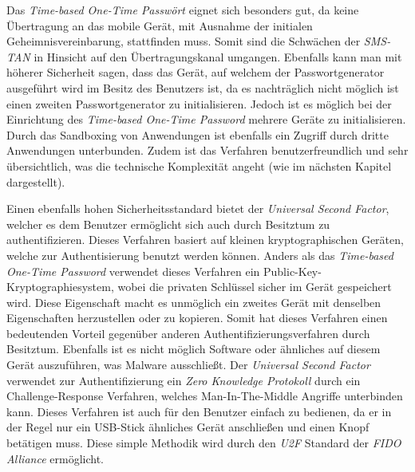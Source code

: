 \documentclass[11pt,a4paper,ngerman]{scrreprt}
\begin{document}
Das \textit{Time-based One-Time Passwört} eignet sich besonders gut, da keine Übertragung an das mobile Gerät, mit Ausnahme der initialen Geheimnisvereinbarung, stattfinden muss. Somit sind die Schwächen der \textit{SMS-TAN} in Hinsicht auf den Übertragungskanal umgangen. Ebenfalls kann man mit höherer Sicherheit sagen, dass das Gerät, auf welchem der Passwortgenerator ausgeführt wird im Besitz des Benutzers ist, da es nachträglich nicht möglich ist einen zweiten Passwortgenerator zu initialisieren. Jedoch ist es möglich bei der Einrichtung des \textit{Time-based One-Time Password} mehrere Geräte zu initialisieren. Durch das Sandboxing von Anwendungen ist ebenfalls ein Zugriff durch dritte Anwendungen unterbunden. Zudem ist das Verfahren benutzerfreundlich und sehr übersichtlich, was die technische Komplexität angeht (wie im nächsten Kapitel dargestellt).

Einen ebenfalls hohen Sicherheitsstandard bietet der \textit{Universal Second Factor}, welcher es dem Benutzer ermöglicht sich auch durch Besitztum zu authentifizieren. Dieses Verfahren basiert auf kleinen kryptographischen Geräten, welche zur Authentisierung benutzt werden können. Anders als das \textit{Time-based One-Time Password} verwendet dieses Verfahren ein Public-Key-Kryptographiesystem, wobei die privaten Schlüssel sicher im Gerät gespeichert wird. Diese Eigenschaft macht es unmöglich ein zweites Gerät mit denselben Eigenschaften herzustellen oder zu kopieren. Somit hat dieses Verfahren einen bedeutenden Vorteil gegenüber anderen Authentifizierungsverfahren durch Besitztum. Ebenfalls ist es nicht möglich Software oder ähnliches auf diesem Gerät auszuführen, was Malware ausschließt. Der \textit{Universal Second Factor} verwendet zur Authentifizierung ein \textit{Zero Knowledge Protokoll} durch ein Challenge-Response Verfahren, welches Man-In-The-Middle Angriffe unterbinden kann. Dieses Verfahren ist auch für den Benutzer einfach zu bedienen, da er in der Regel nur ein USB-Stick ähnliches Gerät anschließen und einen Knopf betätigen muss. Diese simple Methodik wird durch den \textit{U2F} Standard der \textit{FIDO Alliance} ermöglicht.
\end{document}
